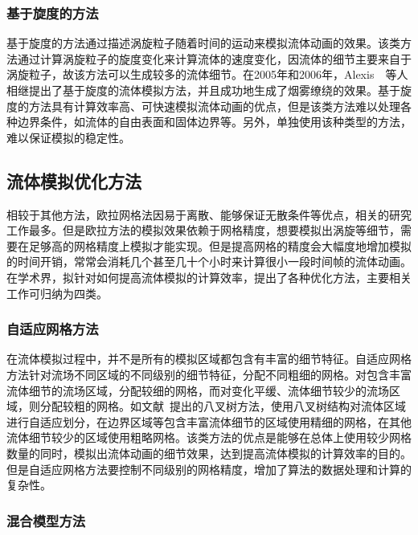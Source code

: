  \subsubsection{基于旋度的方法}
\label{sec:Vortex}

基于旋度的方法通过描述涡旋粒子随着时间的运动来模拟流体动画的效果。该类方法通过计算涡旋粒子的旋度变化来计算流体的速度变化，因流体的细节主要来自于涡旋粒子，故该方法可以生成较多的流体细节。在2005年和2006年，Alexis~\cite{angelidis2005simulation}~\cite{angelidis2006controllable}等人相继提出了基于旋度的流体模拟方法，并且成功地生成了烟雾缭绕的效果。基于旋度的方法具有计算效率高、可快速模拟流体动画的优点，但是该类方法难以处理各种边界条件，如流体的自由表面和固体边界等。另外，单独使用该种类型的方法，难以保证模拟的稳定性。

\subsection{流体模拟优化方法}
\label{sec:optimization}
相较于其他方法，欧拉网格法因易于离散、能够保证无散条件等优点，相关的研究工作最多。但是欧拉方法的模拟效果依赖于网格精度，想要模拟出涡旋等细节，需要在足够高的网格精度上模拟才能实现。但是提高网格的精度会大幅度地增加模拟的时间开销，常常会消耗几个甚至几十个小时来计算很小一段时间帧的流体动画。在学术界，拟针对如何提高流体模拟的计算效率，提出了各种优化方法，主要相关工作可归纳为四类。

\subsubsection{自适应网格方法}
\label{sec:adaptive-gird}

在流体模拟过程中，并不是所有的模拟区域都包含有丰富的细节特征。自适应网格方法针对流场不同区域的不同级别的细节特征，分配不同粗细的网格。对包含丰富流体细节的流场区域，分配较细的网格，而对变化平缓、流体细节较少的流场区域，则分配较粗的网格。如文献~\cite{losasso2004simulating}提出的八叉树方法，使用八叉树结构对流体区域进行自适应划分，在边界区域等包含丰富流体细节的区域使用精细的网格，在其他流体细节较少的区域使用粗略网格。该类方法的优点是能够在总体上使用较少网格数量的同时，模拟出流体动画的细节效果，达到提高流体模拟的计算效率的目的。但是自适应网格方法要控制不同级别的网格精度，增加了算法的数据处理和计算的复杂性。

\subsubsection{混合模型方法}
\label{sec:mix-model}

